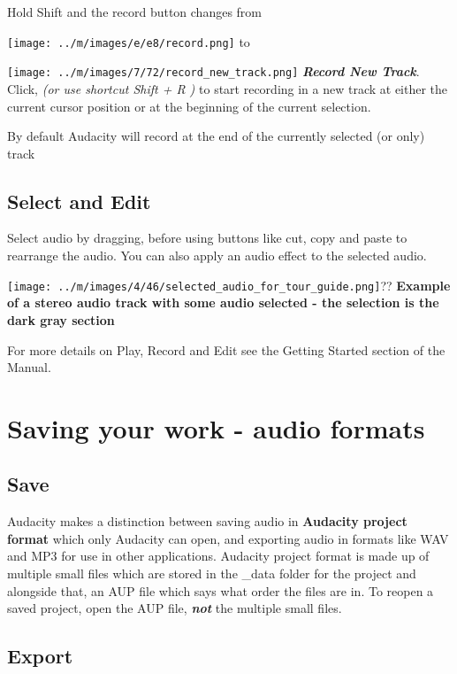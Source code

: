 \documentclass[twocolumn]{book}
\begin{document}
Hold Shift and the record button changes from \par\texttt{[image: ../m/images/e/e8/record.png]} to \par\texttt{[image: ../m/images/7/72/record\_new\_track.png]} \textit{\textbf{Record New Track}}.  Click, \textit{(or use shortcut Shift + R )} to start recording in a new track at either the current cursor position or at the beginning of the current selection.

By default Audacity will record at the end of the currently selected (or only) track

\subsection{Select and Edit}


Select audio by dragging, before using buttons like cut, copy and paste to rearrange the audio.  You can also apply an audio effect to the selected audio.\par\texttt{[image: ../m/images/4/46/selected\_audio\_for\_tour\_guide.png]}??
\textbf{Example of a stereo audio track with some audio selected - the selection is the dark gray section}

For more details on Play, Record and Edit see the Getting Started section of the Manual.




\section{Saving your work - audio formats}


\subsection{Save}


Audacity makes a distinction between saving audio in \textbf{Audacity project format} which only Audacity can open, and exporting audio in formats like WAV and MP3 for use in other applications. Audacity project format is made up of multiple small files which are stored in the \_data folder for the project and alongside that, an  AUP file which says what order the files are in. To reopen a saved project, open the AUP file, \textit{\textbf{not}} the multiple small files. 

\subsection{Export}
\end{document}
